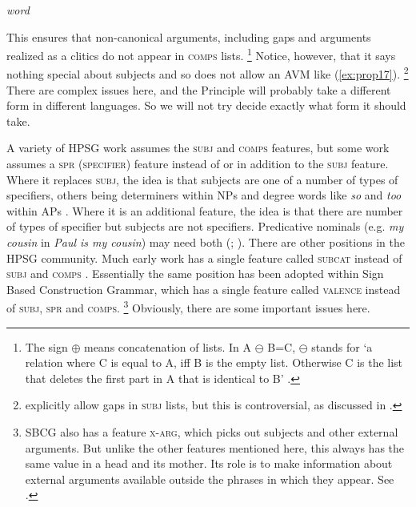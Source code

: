 \documentclass[output=paper
	        ,collection
	        ,collectionchapter
 	        ,biblatex
                ,babelshorthands
                ,newtxmath
                ,draftmode
                ,colorlinks, citecolor=brown
]{langscibook}
\begin{document}
\ea\label{ex:prop20}
\emph{word} \impl
{}
\z

This ensures that non-canonical arguments, including gaps and arguments realized as a clitics do not appear in \textsc{comps} lists.%
%
\footnote{The sign $\oplus$ means concatenation of lists. In A $\ominus$ B=C, $\ominus$ stands for ‘a relation where C is equal to A, iff B is the empty list. Otherwise C is the list that deletes the first part in A that is identical to B’ \citep[]{Mueller2000h}.}
%
Notice, however, that it says nothing special about subjects and so does not allow an AVM like (\ref{ex:prop17}).%
%
\footnote{\citet[177--183]{GSag2000a-u} explicitly allow gaps in \textsc{subj} lists, but this is controversial, as discussed in .}
%
There are complex issues here, and the Principle will probably take a different form in different languages. So we will not try decide exactly what form it should take.

A variety of HPSG work assumes the \textsc{subj} and \textsc{comps} features, but some work assumes a \textsc{spr (specifier)} feature instead of or in addition to the \textsc{subj} feature. Where it replaces \textsc{subj}, the idea is that subjects are one of a number of types of specifiers, others being determiners within NPs and degree words like \emph{so} and \emph{too} within APs \citep{SWB2003a}. Where it is an additional feature, the idea is that there are number of types of specifier but subjects are not specifiers. Predicative nominals (e.g. \emph{my cousin} in \emph{Paul is my cousin}) may need both (\citealp[9.4.1]{ps2}; \citealp[409]{GSag2000a-u}\citealp{AG2003b-u}). There are other positions in the HPSG community. Much early work has a single feature called \textsc{subcat} instead of \textsc{subj} and \textsc{comps} \citep{ps}. Essentially the same position has been adopted within Sign Based Construction Grammar, which has a single feature called \textsc{valence} instead of \textsc{subj, spr} and \textsc{comps}.%
%
\footnote{SBCG also has a feature \textsc{x-arg}, which picks out subjects and other external arguments. But unlike the other features mentioned here, this always has the same value in a head and its mother. Its role is to make information about external arguments available outside the phrases in which they appear.  See \citet[84, 149--151]{Sag2007a,Sag2012a}.}
%
Obviously, there are some important issues here.
\end{document}
